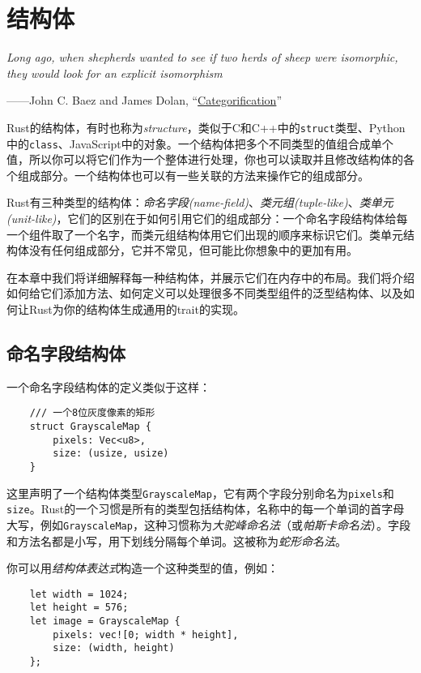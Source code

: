 \chapter{结构体}\label{ch09}

\emph{Long ago, when shepherds wanted to see if two herds of sheep were isomorphic, they would look for an explicit isomorphism}

\begin{flushright}
    ——John C. Baez and James Dolan, “\href{https://arxiv.org/abs/math/9802029}{Categorification}”
\end{flushright}

Rust的结构体，有时也称为\emph{structure}，类似于C和C++中的\texttt{struct}类型、Python中的\texttt{class}、JavaScript中的对象。一个结构体把多个不同类型的值组合成单个值，所以你可以将它们作为一个整体进行处理，你也可以读取并且修改结构体的各个组成部分。一个结构体也可以有一些关联的方法来操作它的组成部分。

Rust有三种类型的结构体：\emph{命名字段(name-field)}、\emph{类元组(tuple-like)}、\emph{类单元(unit-like)}，它们的区别在于如何引用它们的组成部分：一个命名字段结构体给每一个组件取了一个名字，而类元组结构体用它们出现的顺序来标识它们。类单元结构体没有任何组成部分，它并不常见，但可能比你想象中的更加有用。

在本章中我们将详细解释每一种结构体，并展示它们在内存中的布局。我们将介绍如何给它们添加方法、如何定义可以处理很多不同类型组件的泛型结构体、以及如何让Rust为你的结构体生成通用的trait的实现。

\section{命名字段结构体}

一个命名字段结构体的定义类似于这样：
\begin{verbatim}
    /// 一个8位灰度像素的矩形
    struct GrayscaleMap {
        pixels: Vec<u8>,
        size: (usize, usize)
    }
\end{verbatim}

这里声明了一个结构体类型\texttt{GrayscaleMap}，它有两个字段分别命名为\texttt{pixels}和\texttt{size}。Rust的一个习惯是所有的类型包括结构体，名称中的每一个单词的首字母大写，例如\texttt{GrayscaleMap}，这种习惯称为\emph{大驼峰命名法}（或\emph{帕斯卡命名法}）。字段和方法名都是小写，用下划线分隔每个单词。这被称为\emph{蛇形命名法}。

你可以用\emph{结构体表达式}构造一个这种类型的值，例如：
\begin{verbatim}
    let width = 1024;
    let height = 576;
    let image = GrayscaleMap {
        pixels: vec![0; width * height],
        size: (width, height)
    };
\end{verbatim}

